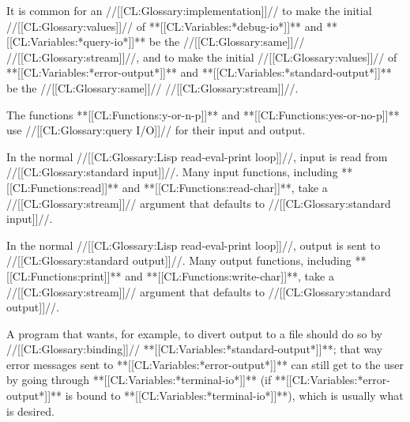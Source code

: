 It is common for an //[[CL:Glossary:implementation]]// to make the initial //[[CL:Glossary:values]]// of **[[CL:Variables:*debug-io*]]** and **[[CL:Variables:*query-io*]]** be the //[[CL:Glossary:same]]// //[[CL:Glossary:stream]]//, and to make the initial //[[CL:Glossary:values]]// of **[[CL:Variables:*error-output*]]** and **[[CL:Variables:*standard-output*]]** be the //[[CL:Glossary:same]]// //[[CL:Glossary:stream]]//.

The functions **[[CL:Functions:y-or-n-p]]** and **[[CL:Functions:yes-or-no-p]]** use //[[CL:Glossary:query I/O]]// for their input and output.

In the normal //[[CL:Glossary:Lisp read-eval-print loop]]//, input is read from //[[CL:Glossary:standard input]]//. Many input functions, including **[[CL:Functions:read]]** and **[[CL:Functions:read-char]]**, take a //[[CL:Glossary:stream]]// argument that defaults to //[[CL:Glossary:standard input]]//.

In the normal //[[CL:Glossary:Lisp read-eval-print loop]]//, output is sent to //[[CL:Glossary:standard output]]//. Many output functions, including **[[CL:Functions:print]]** and **[[CL:Functions:write-char]]**, take a //[[CL:Glossary:stream]]// argument that defaults to //[[CL:Glossary:standard output]]//.

A program that wants, for example, to divert output to a file should do so by //[[CL:Glossary:binding]]// **[[CL:Variables:*standard-output*]]**; that way error messages sent to **[[CL:Variables:*error-output*]]** can still get to the user by going through **[[CL:Variables:*terminal-io*]]** (if **[[CL:Variables:*error-output*]]** is bound to **[[CL:Variables:*terminal-io*]]**), which is usually what is desired.

 

